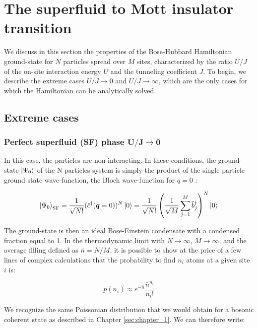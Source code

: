 \section{The superfluid to Mott insulator transition}

We discuss in this section the properties of the Bose-Hubbard Hamiltonian ground-state for $N$ particles spread over $M$ sites, characterized by the ratio $U/J$ of the on-site interaction energy $U$ and the tunneling coefficient $J$. To begin, we describe the extreme cases $U/J \to 0$ and $U/J \to \infty$, which are the only cases for which the Hamiltonian can be analytically solved. 

\subsection{Extreme cases}

\subsubsection{Perfect superfluid (SF) phase $\bm{U/J \to 0}$}

In this case, the particles are non-interacting. In these conditions, the ground-state $\ket{\Psi_0}$ of the N particles system is simply the product of the single particle ground state wave-function, \ie the Bloch wave-function for $q=0$ \cite{bloch2008many}:

\begin{equation}
    \ket{\Psi_0}_{\mathrm{SF}} = \frac{1}{\sqrt{N!}} (\hat{c}^{\dagger}(\bm{q}=0))^N \ket{0} = \frac{1}{\sqrt{N !}}\left(\frac{1}{\sqrt{M}} \sum_{j=1}^{M} \hat{b}_{j}^{\dagger}\right)^{N} \ket{0}
\end{equation}

\noindent The ground-state is then an ideal Bose-Einstein condensate with a condensed fraction equal to 1. In the thermodynamic limit with $N \to \infty$, $M \to \infty$, and the average filling defined as $\bar{n}=N/M$, it is possible to show at the price of a few lines of complex calculations \cite{gerbier_notes} that the probability to find $n_i$ atoms at a given site $i$ is:

\begin{equation}
    p\left(n_{i}\right) \approx e^{-\bar{n}} \frac{\bar{n}^{n_{i}}}{n_{i} !}
\end{equation}

\noindent We recognize the same Poissonian distribution that we would obtain for a bosonic coherent state as described in Chapter \ref{sec:chapter_1}. We can therefore write:

